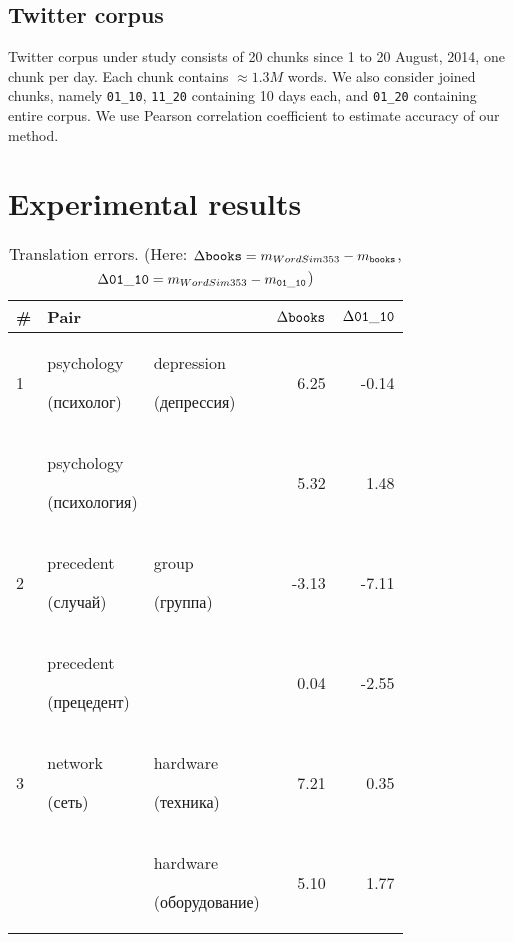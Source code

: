 \documentclass[11pt,letterpaper]{article}
\begin{document}
\subsection{Twitter corpus}

Twitter corpus under study consists of 20 chunks since 1 to 20 August, 2014, one chunk per day.
Each chunk contains $\approx 1.3M$ words.
We also consider joined chunks, namely {\tt 01\_10}, {\tt 11\_20} containing 10 days each, and 
{\tt 01\_20} containing entire corpus.
We use Pearson correlation coefficient to estimate accuracy of our method.

\section{Experimental results}

\begin{table*}[t]
\begin{center}
\begin{tabular}{|l|ll|r|r|}
\hline \bf \# & \bf Pair &  &   $\Delta {\tt books} $ & $ \Delta {\tt 01\_10} $  \\ \hline
1 & psychology  \begin{russian}(психолог)\end{russian} & depression \begin{russian}(депрессия)\end{russian} & 6.25 & -0.14 \\
 & psychology  \begin{russian}(психология)\end{russian} &  & 5.32 & 1.48 \\
\hline
2 & precedent \begin{russian}(случай)\end{russian} & group \begin{russian}(группа)\end{russian}  & -3.13 & -7.11  \\
 & precedent \begin{russian}(прецедент)\end{russian} &  & 0.04 & -2.55  \\
\hline
3 & network \begin{russian}(сеть)\end{russian} & hardware \begin{russian}(техника)\end{russian} & 7.21 & 0.35 \\
 &  & hardware \begin{russian}(оборудование)\end{russian} & 5.10 & 1.77 \\
\hline
\end{tabular}
\end{center}
\caption{\label{translation-error} Translation errors. 
  (Here: $\Delta {\tt books} =  m_{WordSim353} - m_{\tt books}$,
$\Delta {\tt 01\_10} =  m_{WordSim353} - m_{\tt 01\_10}$)
}
\end{table*}
\end{document}
